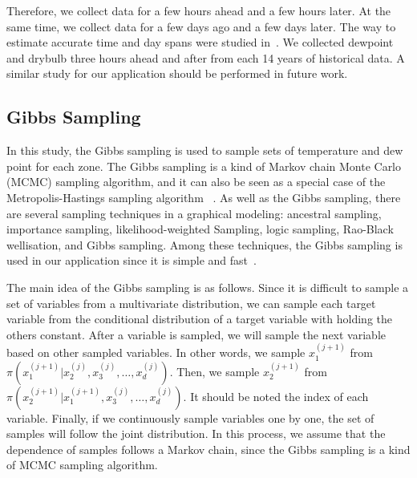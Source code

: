\documentclass[journal]{IEEEtran} %
\begin{document}
Therefore, we collect data for a few hours ahead and a few hours later. At the same time, we collect data for a few days ago and a few days later. The way to estimate accurate time and day spans were studied in~\cite{xie2016temperature}. We collected dewpoint and drybulb three hours ahead and after from each 14 years of historical data. A similar study for our application should be performed in future work.

















\subsection{Gibbs Sampling}
In this study, the Gibbs sampling is used to sample sets of temperature and dew point for each zone. The Gibbs sampling is a kind of Markov chain Monte Carlo (MCMC) sampling algorithm, and it can also be seen as a special case of the Metropolis-Hastings sampling algorithm~\cite{Bishop2006} . As well as the Gibbs sampling, there are several sampling techniques in a graphical modeling: ancestral sampling, importance sampling, likelihood-weighted Sampling, logic sampling, Rao-Black wellisation, and Gibbs sampling. Among these techniques, the Gibbs sampling is used in our application since it is simple and fast~\cite{Gibbs}.


The main idea of the Gibbs sampling is as follows. Since it is difficult to sample a set of variables from a multivariate distribution, we can sample each target variable from the conditional distribution of a target variable with holding the others constant. After a variable is sampled, we will sample the next variable based on other sampled variables. In other words, we sample $x_1^{(j + 1)}$ from $\pi (x_1^{(j + 1)}|x_2^{(j)},x_3^{(j)}, \ldots ,x_d^{(j)})$. Then, we sample $x_2^{(j + 1)}$ from $\pi (x_2^{(j + 1)}|x_1^{(j+1)},x_3^{(j)}, \ldots ,x_d^{(j)})$. It should be noted the index of each variable. Finally, if we continuously sample variables one by one, the set of samples will follow the joint distribution. In this process, we assume that the dependence of samples follows a Markov chain, since the Gibbs sampling is a kind of MCMC sampling algorithm. 
\end{document}
